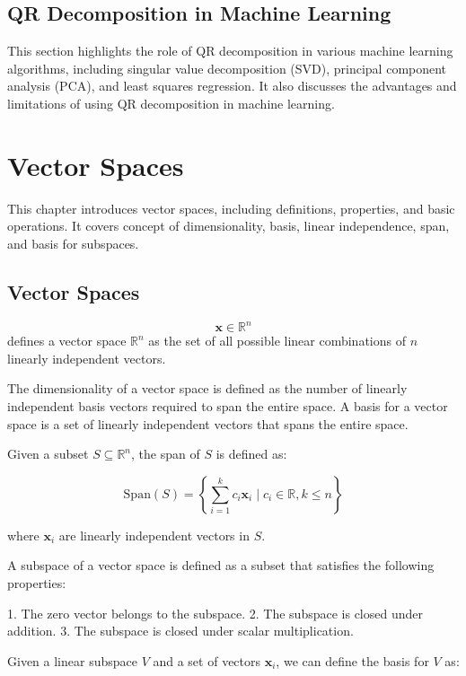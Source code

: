 \documentclass{report}%
\begin{document}
%
%
\section{QR Decomposition in Machine Learning}%
This section highlights the role of QR decomposition in various machine learning algorithms, including singular value decomposition (SVD), principal component analysis (PCA), and least squares regression. It also discusses the advantages and limitations of using QR decomposition in machine learning.

%
\chapter{Vector Spaces}%
This chapter introduces vector spaces, including definitions, properties, and basic operations. It covers concept of dimensionality, basis, linear independence, span, and basis for subspaces.

%
\section{Vector Spaces}

\label{sec:vector-spaces}
\begin{equation}
\mathbf{x} \in \mathbb{R}^n
\end{equation}
defines a vector space $\mathbb{R}^n$ as the set of all possible linear combinations of $n$ linearly independent vectors.

The dimensionality of a vector space is defined as the number of linearly independent basis vectors required to span the entire space. A basis for a vector space is a set of linearly independent vectors that spans the entire space.

\label{def:span}
Given a subset $S \subseteq \mathbb{R}^n$, the span of $S$ is defined as:

$$
\text{Span}(S) = \left\{
\sum_{i=1}^{k} c_i \mathbf{x}_i \mid c_i \in \mathbb{R}, k \leq n
\right\}
$$

where $\mathbf{x}_i$ are linearly independent vectors in $S$.

A subspace of a vector space is defined as a subset that satisfies the following properties:

1. The zero vector belongs to the subspace.
2. The subspace is closed under addition.
3. The subspace is closed under scalar multiplication.

\label{def:subspace}
Given a linear subspace $V$ and a set of vectors $\mathbf{x}_i$, we can define the basis for $V$ as:
\end{document}
